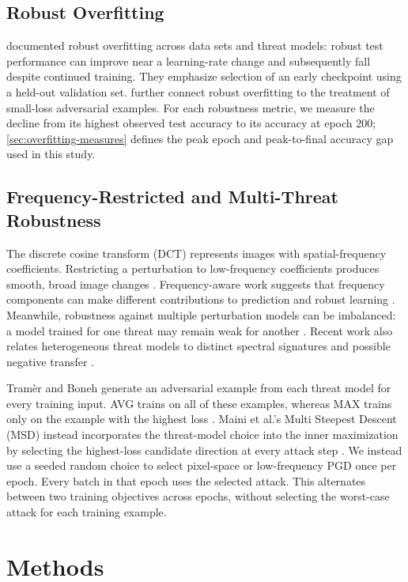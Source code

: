 \documentclass{article}
\begin{document}
\subsection{Robust Overfitting}
\citet{rice2020} documented robust overfitting across data sets and
threat models: robust test performance can improve near a learning-rate change
and subsequently fall despite continued training. They emphasize selection of
an early checkpoint using a held-out validation set. \citet{yu2022}
further connect robust overfitting to the treatment of small-loss adversarial
examples. For each robustness metric, we measure the decline from its highest observed
test accuracy to its accuracy at epoch 200; \cref{sec:overfitting-measures}
defines the peak epoch and peak-to-final accuracy gap used in this study.

\subsection{Frequency-Restricted and Multi-Threat Robustness}
The discrete cosine transform (DCT) represents images with spatial-frequency
coefficients. Restricting a perturbation to low-frequency coefficients produces
smooth, broad image changes \citep{guo2020}. Frequency-aware work suggests that
frequency components can make different contributions to prediction and robust
learning \citep{chen2022,bu2023}. Meanwhile, robustness against multiple
perturbation models can be imbalanced: a model trained for one threat may
remain weak for another \citep{tramer2019,maini2020}. Recent work also relates
heterogeneous threat models to distinct spectral signatures and possible
negative transfer \citep{xie2026}.

Tram\`er and Boneh generate an adversarial example from each threat model for
every training input. AVG trains on all of these examples, whereas MAX trains
only on the example with the highest loss \citep{tramer2019}. Maini
et al.'s Multi Steepest Descent (MSD) instead incorporates the threat-model
choice into the inner maximization by selecting the highest-loss candidate
direction at every attack step \citep{maini2020}. We instead use a
seeded random choice to select pixel-space or low-frequency PGD once per
epoch. Every batch in that epoch uses the selected attack. This alternates
between two training objectives across epochs, without selecting the
worst-case attack for each training example.

\section{Methods}
\label{sec:methods}
\end{document}
